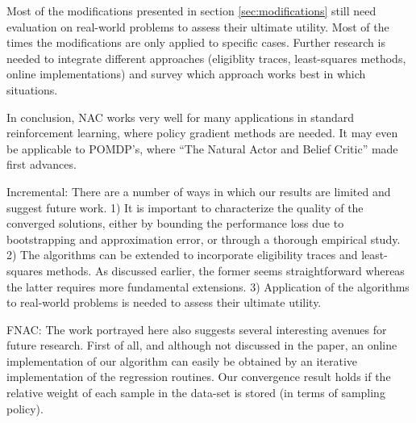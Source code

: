 Most of the modifications presented in section \ref{sec:modifications} still need evaluation on real-world problems to assess their ultimate utility. Most of the times the modifications are only applied to specific cases. Further research is needed to integrate different approaches (eligiblity traces, least-squares methods, online implementations) and survey which approach works best in which situations.

In conclusion, NAC works very well for many applications in standard reinforcement learning, where policy gradient methods are needed. It may even be applicable to POMDP's, where ``The Natural Actor and Belief Critic'' \cite{jurvcivcek2011natural} made first advances.

\iffalse
\begin{itemize}
	\x Incremental: There are a number of ways in which our results are limited and suggest future work. 1) It is important to characterize the quality of the converged solutions, either by bounding the performance loss due to bootstrapping and approximation error, or through a thorough empirical study. 2) The algorithms can be extended to incorporate eligibility traces and least-squares methods. As discussed earlier, the former seems straightforward whereas the latter requires more fundamental extensions. 3) Application of the algorithms to real-world problems is needed to assess their ultimate utility.
	
	\x FNAC: The work portrayed here also suggests several interesting avenues for future research. First of all, and although not discussed in the paper, an online implementation of our algorithm can easily be obtained by an iterative implementation of the regression routines. Our convergence result holds if the relative weight of each sample in the data-set is stored (in terms of sampling policy). 
	

\end{itemize}
